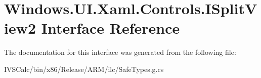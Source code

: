 \hypertarget{interface_windows_1_1_u_i_1_1_xaml_1_1_controls_1_1_i_split_view2}{}\section{Windows.\+U\+I.\+Xaml.\+Controls.\+I\+Split\+View2 Interface Reference}
\label{interface_windows_1_1_u_i_1_1_xaml_1_1_controls_1_1_i_split_view2}


The documentation for this interface was generated from the following file\+:\begin{DoxyCompactItemize}
\item 
I\+V\+S\+Calc/bin/x86/\+Release/\+A\+R\+M/ilc/Safe\+Types.\+g.\+cs\end{DoxyCompactItemize}

